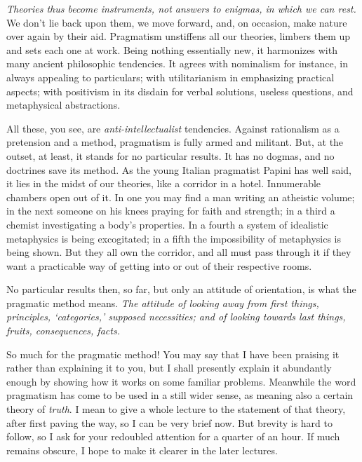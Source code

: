 \documentclass[]{article}
\begin{document}
\emph{Theories thus become instruments, not answers to enigmas, in which
we can rest.} We don't lie back upon them, we move forward, and, on
occasion, make nature over again by their aid. Pragmatism unstiffens all
our theories, limbers them up and sets each one at work. Being nothing
essentially new, it harmonizes with many ancient philosophic tendencies.
It agrees with nominalism for instance, in always appealing to
particulars; with utilitarianism in emphasizing practical aspects; with
positivism in its disdain for verbal solutions, useless questions, and
metaphysical abstractions.

All these, you see, are \emph{anti-intellectualist} tendencies. Against
rationalism as a pretension and a method, pragmatism is fully armed
and militant. But, at the outset, at least, it stands for no particular
results. It has no dogmas, and no doctrines save its method. As the
young Italian pragmatist Papini has well said, it lies in the midst of
our theories, like a corridor in a hotel. Innumerable chambers open out
of it. In one you may find a man writing an atheistic volume; in the
next someone on his knees praying for faith and strength; in a third
a chemist investigating a body's properties. In a fourth a system
of idealistic metaphysics is being excogitated; in a fifth the
impossibility of metaphysics is being shown. But they all own the
corridor, and all must pass through it if they want a practicable way of
getting into or out of their respective rooms.

No particular results then, so far, but only an attitude of orientation,
is what the pragmatic method means. \emph{The attitude of looking away from
first things, principles, `categories,' supposed necessities; and of
looking towards last things, fruits, consequences, facts.}

So much for the pragmatic method! You may say that I have been praising
it rather than explaining it to you, but I shall presently explain it
abundantly enough by showing how it works on some familiar problems.
Meanwhile the word pragmatism has come to be used in a still wider
sense, as meaning also a certain theory of \emph{truth}. I mean to give a whole
lecture to the statement of that theory, after first paving the way,
so I can be very brief now. But brevity is hard to follow, so I ask
for your redoubled attention for a quarter of an hour. If much remains
obscure, I hope to make it clearer in the later lectures.
\end{document}
